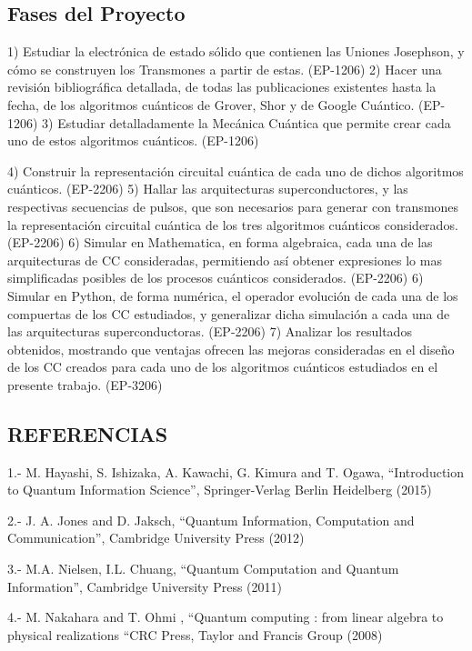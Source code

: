\subsection{Fases del Proyecto}

1) Estudiar la electrónica de estado sólido que contienen las Uniones Josephson, y cómo se construyen los
Transmones a partir de estas. (EP-1206)
2) Hacer una revisión bibliográfica detallada, de todas las publicaciones existentes hasta la fecha, de los
algoritmos cuánticos de Grover, Shor y de Google Cuántico. (EP-1206)
3) Estudiar detalladamente la Mecánica Cuántica que permite crear cada uno de estos algoritmos cuánticos. (EP-1206)

4) Construir la representación circuital cuántica de cada uno de dichos algoritmos cuánticos. (EP-2206)
5) Hallar las arquitecturas superconductores, y las respectivas secuencias de pulsos, que son necesarios
para generar con transmones la representación circuital cuántica de los tres algoritmos cuánticos considerados. (EP-2206)
6) Simular en Mathematica, en forma algebraica, cada una de las arquitecturas de CC consideradas,
permitiendo así obtener expresiones lo mas simplificadas posibles de los procesos cuánticos considerados.
(EP-2206)
6) Simular en Python, de forma numérica, el operador evolución de cada una de los compuertas de los CC
estudiados, y generalizar dicha simulación a cada una de las arquitecturas superconductoras. (EP-2206)
7) Analizar los resultados obtenidos, mostrando que ventajas ofrecen las mejoras consideradas en el
diseño de los CC creados para cada uno de los algoritmos cuánticos estudiados en el presente trabajo. (EP-3206)


\subsection{REFERENCIAS}

1.- M. Hayashi, S. Ishizaka, A. Kawachi, G. Kimura and T. Ogawa, “Introduction to Quantum Information Science”, Springer-Verlag Berlin Heidelberg (2015)

2.- J. A. Jones and D. Jaksch, “Quantum Information, Computation and Communication”, Cambridge University Press (2012)

3.- M.A. Nielsen, I.L. Chuang, “Quantum Computation and Quantum Information”, Cambridge University Press (2011)

4.- M. Nakahara and T. Ohmi , “Quantum computing : from linear algebra to physical realizations “CRC Press, Taylor and Francis Group (2008)

